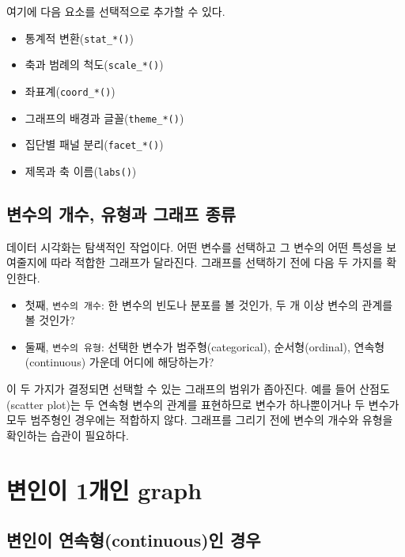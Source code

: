 \documentclass[
]{book}
\providecommand{\tightlist}{%
  \setlength{\itemsep}{0pt}\setlength{\parskip}{0pt}}
\begin{document}
여기에 다음 요소를 선택적으로 추가할 수 있다.

\begin{itemize}
\tightlist
\item
  통계적 변환(\texttt{stat\_*()})
\item
  축과 범례의 척도(\texttt{scale\_*()})
\item
  좌표계(\texttt{coord\_*()})
\item
  그래프의 배경과 글꼴(\texttt{theme\_*()})
\item
  집단별 패널 분리(\texttt{facet\_*()})
\item
  제목과 축 이름(\texttt{labs()})
\end{itemize}

\subsection{변수의 개수, 유형과 그래프 종류}\label{uxbcc0uxc218uxc758-uxac1cuxc218-uxc720uxd615uxacfc-uxadf8uxb798uxd504-uxc885uxb958}

데이터 시각화는 탐색적인 작업이다. 어떤 변수를 선택하고 그 변수의 어떤 특성을 보여줄지에 따라 적합한 그래프가 달라진다. 그래프를 선택하기 전에 다음 두 가지를 확인한다.

\begin{itemize}
\item
  첫째, \texttt{변수의\ 개수}: 한 변수의 빈도나 분포를 볼 것인가, 두 개 이상 변수의 관계를 볼 것인가?
\item
  둘째, \texttt{변수의\ 유형}: 선택한 변수가 범주형(categorical), 순서형(ordinal), 연속형(continuous) 가운데 어디에 해당하는가?
\end{itemize}

이 두 가지가 결정되면 선택할 수 있는 그래프의 범위가 좁아진다. 예를 들어 산점도(scatter plot)는 두 연속형 변수의 관계를 표현하므로 변수가 하나뿐이거나 두 변수가 모두 범주형인 경우에는 적합하지 않다. 그래프를 그리기 전에 변수의 개수와 유형을 확인하는 습관이 필요하다.

\section{변인이 1개인 graph}\label{uxbcc0uxc778uxc774-1uxac1cuxc778-graph}

\subsection{변인이 연속형(continuous)인 경우}\label{uxbcc0uxc778uxc774-uxc5f0uxc18duxd615continuousuxc778-uxacbduxc6b0}
\end{document}
